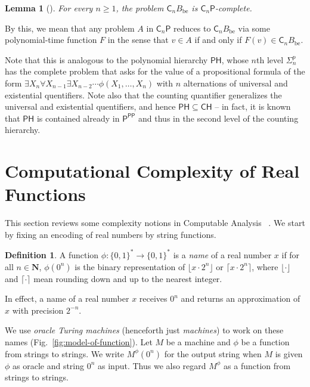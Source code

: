 \documentclass[12pt,a4paper]{article}
\newtheorem{lemma}[theorem]{Lemma}
\theoremstyle{definition}
\newtheorem{definition}[theorem]{Definition}
\theoremstyle{remark}
\newcommand{\N}{\mathbf N}
\newcommand{\classP}{\mathsf{P}}
\newcommand{\classPH}{\mathsf{PH}}
\newcommand{\classPP}{\mathsf{PP}}
\newcommand{\classCH}{\mathsf{CH}}
\newcommand{\classSigma}{\mathsf{\Sigma}}
\newcommand{\quantC}{\mathsf{C}}
\begin{document}
\begin{lemma}[{\cite[Theorem 7]{wagner1986complexity}}] \label{lemma:CnP-complete}
 For every $n \ge 1$, 
 the problem $\quantC_n B_{\mathrm{be}}$ is $\quantC_n\classP$-complete.
\end{lemma}

By this, we mean that 
any problem $A$ in $\quantC_n \classP$ reduces to $\quantC_n B_{\mathrm{be}}$ 
via some polynomial-time function $F$ 
in the sense that $v \in A$ if and only if $F (v) \in \quantC_n B_{\mathrm{be}}$. 

Note that this is analogous to the polynomial hierarchy $\classPH$, 
whose $n$th level $\classSigma ^p _n$ has the complete problem
that asks for the value of a propositional formula of the form $
\exists X _n \forall X _{n - 1} \exists X _{n - 2} \cdots \phi (X_1, \dots, X_n)
$ with $n$ alternations of universal and existential quentifiers. 
Note also that the counting quantifier generalizes 
the universal and existential quentifiers, and hence $\classPH \subseteq \classCH$ -- 
in fact, it is known~\cite{toda} that 
$\classPH$ is contained already in $\classP ^{\classPP}$
and thus in the second level of the counting hierarchy. 

\section{Computational Complexity of Real Functions}
\label{section: preliminaries}

This section reviews some complexity notions 
in Computable Analysis~%
\cite{ko1991complexity,weihrauch00:_comput_analy}. 
We start by fixing an encoding of real numbers 
by string functions.

\begin{definition}
 A function $\phi \colon \{0, 1\} ^* \to \{0, 1\}^*$ is a \emph{name} of a real number $x$ 
 if for all $n \in \N$,
 $\phi(0^n)$ is the binary representation of $\lfloor x \cdot 2^n \rfloor$ or
 $\lceil x \cdot 2^n \rceil$,
 where $\lfloor \cdot \rfloor$ and $\lceil \cdot \rceil$ mean
 rounding down and up to the nearest integer.
 \end{definition}

In effect, a name of a real number $x$ receives $0 ^n$ and 
returns an approximation of $x$ with precision $2 ^{-n}$.

We use \emph{oracle Turing machines} (henceforth just \emph{machines})
to work on these names (Fig.~\ref{fig:model-of-function}).
Let $M$ be a machine and $\phi$ be a function from strings to strings. 
We write $M ^\phi (0 ^n)$ for the output string 
when $M$ is given
$\phi$ as oracle and string $0^n$ as input.
Thus we also regard $M^\phi$ as a function from strings to strings.
\end{document}
